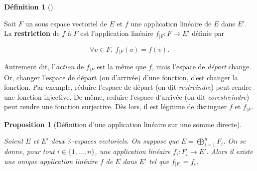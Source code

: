 \documentclass[
  french,
  letterpaper,
  DIV=11,
  numbers=noendperiod]{scrreprt}
\theoremstyle{plain}
\theoremstyle{definition}
\newtheorem{definition}{Définition}[chapter]
\theoremstyle{plain}
\newtheorem{proposition}{Proposition}[chapter]
\theoremstyle{plain}
\theoremstyle{definition}
\theoremstyle{definition}
\theoremstyle{plain}
\theoremstyle{remark}
\newcounter{quartocalloutnteno}
\newcommand{\quartocalloutnte}[1]{\refstepcounter{quartocalloutnteno}\label{#1}}
\begin{document}
\begin{definition}[]\protect\hypertarget{def-restriction}{}\label{def-restriction}

Soit \(F\) un sous espace vectoriel de \(E\) et \(f\) une application
linéaire de \(E\) dans \(E'\). La \textbf{restriction} de \(f\) à \(F\)
est l'application linéaire \(f_{|F}:F \to E'\) définie par

\[
\forall v \in F,\ f_{|F}(v) = f(v).
\]

\end{definition}

\begin{tcolorbox}[enhanced jigsaw, arc=.35mm, bottomrule=.15mm, bottomtitle=1mm, breakable, colback=white, colbacktitle=quarto-callout-note-color!10!white, colframe=quarto-callout-note-color-frame, coltitle=black, left=2mm, leftrule=.75mm, opacityback=0, opacitybacktitle=0.6, rightrule=.15mm, title=\textcolor{quarto-callout-note-color}{\faInfo}\hspace{0.5em}{Note \ref*{nte-restriction}}, titlerule=0mm, toprule=.15mm, toptitle=1mm]

\quartocalloutnte{nte-restriction} 

Autrement dit, l'\emph{action} de \(f_{|F}\) est la même que \(f\), mais
l'espace de \emph{départ} change. Or, changer l'espace de départ (ou
d'arrivée) d'une fonction, c'est changer la fonction. Par exemple,
réduire l'espace de départ (on dit \emph{restreindre}) peut rendre une
fonction injective. De même, reduire l'espace d'arrivée (on dit
\emph{corestreindre}) peut rendre une fonction surjective. Dès lors, il
est légitime de distinguer \(f\) et \(f_{|F}\).

\end{tcolorbox}

\begin{proposition}[Définition d'une application linéaire sur une somme
directe]\protect\hypertarget{prp-definition-somme-directe}{}\label{prp-definition-somme-directe}

Soient \(E\) et \(E'\) deux \(\mathbb{K}\)-espaces vectoriels. On
suppose que \(E=\bigoplus_{i=1}^{n}F_{i}\). On se donne, pour tout
\(i \in \{1,\dots,n\}\), une application linéaire \(f_i:F_i \to E'\).
Alors il existe une unique application linéaire \(f\) de \(E\) dans
\(E'\) tel que \(f_{|F_{i}}=f_i\).

\end{proposition}
\end{document}
